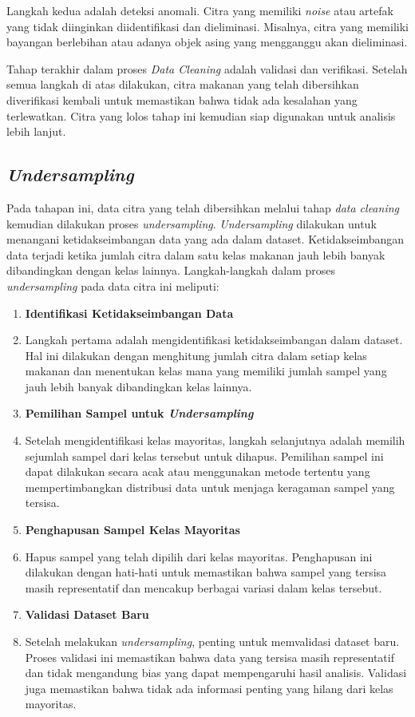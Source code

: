 Langkah kedua adalah deteksi anomali. Citra yang memiliki \textit{noise} atau artefak yang tidak diinginkan diidentifikasi dan dieliminasi. Misalnya, citra yang memiliki bayangan berlebihan atau adanya objek asing yang mengganggu akan dieliminasi.

Tahap terakhir dalam proses \textit{Data Cleaning} adalah validasi dan verifikasi. Setelah semua langkah di atas dilakukan, citra makanan yang telah dibersihkan diverifikasi kembali untuk memastikan bahwa tidak ada kesalahan yang terlewatkan. Citra yang lolos tahap ini kemudian siap digunakan untuk analisis lebih lanjut.

\subsection{\textit{Undersampling}}
Pada tahapan ini, data citra yang telah dibersihkan melalui tahap \textit{data cleaning} kemudian dilakukan proses \textit{undersampling}. \textit{Undersampling} dilakukan untuk menangani ketidakseimbangan data yang ada dalam dataset. Ketidakseimbangan data terjadi ketika jumlah citra dalam satu kelas makanan jauh lebih banyak dibandingkan dengan kelas lainnya. Langkah-langkah dalam proses \textit{undersampling} pada data citra ini meliputi:
\begin{enumerate}
    \item \textbf{Identifikasi Ketidakseimbangan Data} 
    \item[] Langkah pertama adalah mengidentifikasi ketidakseimbangan dalam dataset. Hal ini dilakukan dengan menghitung jumlah citra dalam setiap kelas makanan dan menentukan kelas mana yang memiliki jumlah sampel yang jauh lebih banyak dibandingkan kelas lainnya.
    \item \textbf{Pemilihan Sampel untuk \textit{Undersampling}} 
    \item[] Setelah mengidentifikasi kelas mayoritas, langkah selanjutnya adalah memilih sejumlah sampel dari kelas tersebut untuk dihapus. Pemilihan sampel ini dapat dilakukan secara acak atau menggunakan metode tertentu yang mempertimbangkan distribusi data untuk menjaga keragaman sampel yang tersisa.
    \item \textbf{Penghapusan Sampel Kelas Mayoritas} 
    \item[] Hapus sampel yang telah dipilih dari kelas mayoritas. Penghapusan ini dilakukan dengan hati-hati untuk memastikan bahwa sampel yang tersisa masih representatif dan mencakup berbagai variasi dalam kelas tersebut.
    \item \textbf{Validasi Dataset Baru} 
    \item[] Setelah melakukan \textit{undersampling}, penting untuk memvalidasi dataset baru. Proses validasi ini memastikan bahwa data yang tersisa masih representatif dan tidak mengandung bias yang dapat mempengaruhi hasil analisis. Validasi juga memastikan bahwa tidak ada informasi penting yang hilang dari kelas mayoritas.
\end{enumerate}


